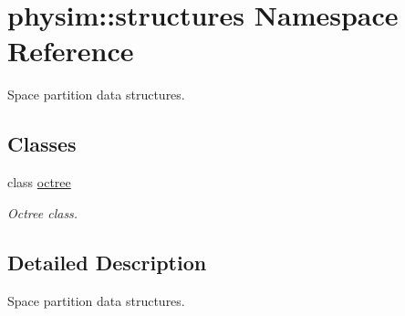 \hypertarget{namespacephysim_1_1structures}{}\section{physim\+:\+:structures Namespace Reference}
\label{namespacephysim_1_1structures}


Space partition data structures.  


\subsection*{Classes}
\begin{DoxyCompactItemize}
\item 
class \hyperlink{classphysim_1_1structures_1_1octree}{octree}
\begin{DoxyCompactList}\small\item\em Octree class. \end{DoxyCompactList}\end{DoxyCompactItemize}


\subsection{Detailed Description}
Space partition data structures. 